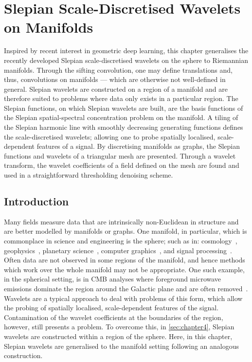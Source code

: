\chapter{Slepian Scale-Discretised Wavelets on Manifolds}\label{sec:chapter5}

Inspired by recent interest in geometric deep learning, this chapter generalises the recently developed Slepian scale-discretised wavelets on the sphere to Riemannian manifolds.
Through the sifting convolution, one may define translations and, thus, convolutions on manifolds --- which are otherwise not well-defined in general.
Slepian wavelets are constructed on a region of a manifold and are therefore suited to problems where data only exists in a particular region.
The Slepian functions, on which Slepian wavelets are built, are the basis functions of the Slepian spatial-spectral concentration problem on the manifold.
A tiling of the Slepian harmonic line with smoothly decreasing generating functions defines the scale-discretised wavelets; allowing one to probe spatially localised, scale-dependent features of a signal.
By discretising manifolds as graphs, the Slepian functions and wavelets of a triangular mesh are presented.
Through a wavelet transform, the wavelet coefficients of a field defined on the mesh are found and used in a straightforward thresholding denoising scheme.

\section{Introduction}

Many fields measure data that are intrinsically non-Euclidean in structure and are better modelled by manifolds or graphs.
One manifold, in particular, which is commonplace in science and engineering is the sphere; such as in: cosmology~\cite{Bennett1996}, geophysics~\cite{Simons2006}, planetary science~\cite{Turcotte1981}, computer graphics~\cite{Ramamoorthi2004}, and signal processing~\cite{Roddy2022}.
Often data are not observed in some regions of the manifold, and hence methods which work over the whole manifold may not be appropriate.
One such example, in the spherical setting, is in CMB analyses where foreground microwave emissions dominate the region around the Galactic plane and are often removed~\cite{Mortlock2002}.
Wavelets are a typical approach to deal with problems of this form, which allow the probing of spatially localised, scale-dependent features of the signal.
Contamination of the wavelet coefficients at the boundaries of the region, however, still presents a problem.
To overcome this, in \cref{sec:chapter4}, Slepian wavelets are constructed within a region of the sphere.
Here, in this chapter, Slepian wavelets are generalised to the manifold setting following an analogous construction.

